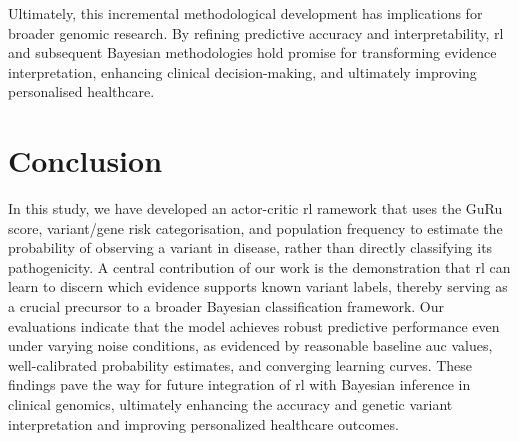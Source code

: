 Ultimately, this incremental methodological development has implications for broader genomic research. By refining predictive accuracy and interpretability, \ac{rl} and subsequent Bayesian methodologies hold promise for transforming evidence interpretation, enhancing clinical decision-making, and ultimately improving personalised healthcare.

\section{Conclusion}
In this study, we have developed an actor-critic \ac{rl} ramework that uses the GuRu score, variant/gene risk categorisation, and population frequency to estimate the probability of observing a variant in disease, rather than directly classifying its pathogenicity. A central contribution of our work is the demonstration that \ac{rl} can learn to discern which evidence supports known variant labels, thereby serving as a crucial precursor to a broader Bayesian classification framework. Our evaluations indicate that the model achieves robust predictive performance even under varying noise conditions, as evidenced by reasonable baseline \ac{auc} values, well-calibrated probability estimates, and converging learning curves. These findings pave the way for future integration of \ac{rl} with Bayesian inference in clinical genomics, ultimately enhancing the accuracy and genetic variant interpretation and improving personalized healthcare outcomes.

\clearpage

  


